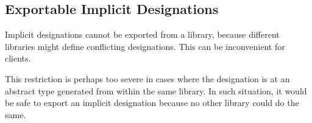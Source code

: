 

\subsection{Exportable Implicit Designations}
Implicit designations cannot be exported from a library, because different libraries might define conflicting designations. This can be inconvenient for clients.

This restriction is perhaps too severe in cases where the designation is at an abstract type generated from within the same library. In such situation, it would be safe to export an implicit designation because no other library could do the same.


